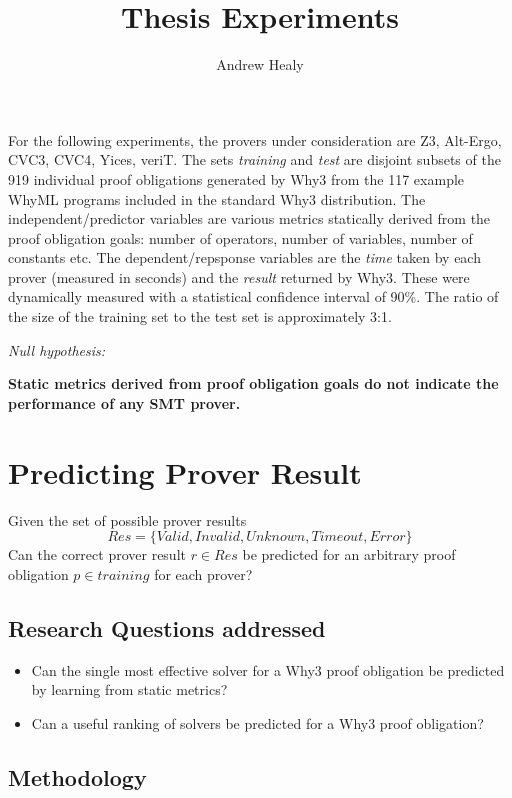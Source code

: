 \documentclass[]{article}
\title{Thesis Experiments}
\author{Andrew Healy}
\begin{document}
\maketitle

For the following experiments, the provers under consideration are Z3, Alt-Ergo, CVC3, CVC4, Yices, veriT. The sets \emph{training} and \emph{test} are disjoint subsets of the 919 individual proof obligations generated by Why3 from the 117 example WhyML programs included in the standard Why3 distribution. The independent/predictor variables are various metrics statically derived from the proof obligation goals: number of operators, number of variables, number of constants etc. The dependent/repsponse variables are the \emph{time} taken by each prover (measured in seconds) and the \emph{result} returned by Why3. These were dynamically measured with a statistical confidence interval of 90\%. The ratio of the size of the training set to the test set is approximately 3:1.
\vspace{0.4cm}

\textit{Null hypothesis:}

\textbf{Static metrics derived from proof obligation goals do not indicate the performance of any SMT prover.} 

\section{Predicting Prover Result}


Given the set of possible prover results 
\[ 
 Res = \lbrace Valid, Invalid, Unknown, Timeout, Error \rbrace
\]
Can the correct prover result $r \in  Res$ be predicted for an arbitrary proof obligation $p \in training$ for each prover?

\subsection{Research Questions addressed}
\label{rq1}
\begin{itemize}
\item{Can the single most effective solver for a Why3 proof obligation be predicted by learning from static metrics?}
\item{Can a useful ranking of solvers be predicted for a Why3 proof obligation?}
\end{itemize}

\subsection{Methodology}
\end{document}
